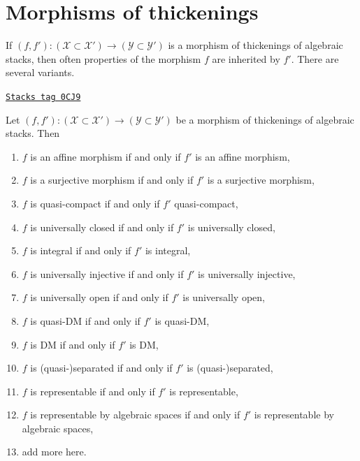 \section{Morphisms of thickenings}
\label{stacks-more-morphisms-section-morphisms-thickenings}
If $(f, f') : (\mathcal{X} \subset \mathcal{X}') \to
(\mathcal{Y} \subset \mathcal{Y}')$ is a morphism
of thickenings of algebraic stacks, then often properties of the morphism
$f$ are inherited by $f'$. There are several variants.

\begin{lemma}
\label{stacks-more-morphisms-lemma-thicken-property-morphisms}
\href{https://stacks.math.columbia.edu/tag/0CJ9}{\texttt{Stacks tag 0CJ9}}

Let $(f, f') : (\mathcal{X} \subset \mathcal{X}') \to
(\mathcal{Y} \subset \mathcal{Y}')$
be a morphism of thickenings of algebraic stacks. Then
\begin{enumerate}
\item $f$ is an affine morphism if and only if $f'$ is an affine morphism,
\item $f$ is a surjective morphism if and only if $f'$ is a surjective morphism,
\item $f$ is quasi-compact if and only if $f'$ quasi-compact,
\item $f$ is universally closed if and only if $f'$ is universally closed,
\item $f$ is integral if and only if $f'$ is integral,
\item $f$ is universally injective if and only if $f'$ is universally injective,
\item $f$ is universally open if and only if $f'$ is universally open,
\item $f$ is quasi-DM if and only if $f'$ is quasi-DM,
\item $f$ is DM if and only if $f'$ is DM,
\item $f$ is (quasi-)separated if and only if $f'$ is (quasi-)separated,
\item $f$ is representable if and only if $f'$ is representable,
\item $f$ is representable by algebraic spaces if and only if $f'$ is
representable by algebraic spaces,
\item add more here.
\end{enumerate}
\end{lemma}

